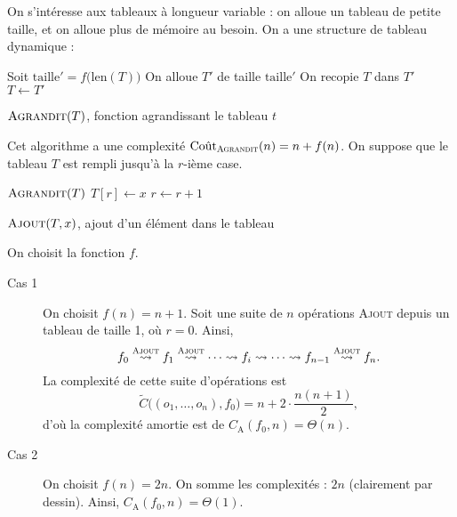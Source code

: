 {{		\begin{exm}
			On s'intéresse aux tableaux à longueur variable : on alloue un tableau de petite taille, et on alloue plus de mémoire au besoin.
			On a une structure de tableau dynamique :
			\begin{algorithm}[H]
				\centering
				\begin{algorithmic}[1]
					\State Soit $\mathrm{taille}' = f\big(\mathrm{len}(T)\big)$ 
					\State On alloue $T'$\/ de taille $\mathrm{taille}'$
					\State On recopie $T$\/ dans $T'$\/
					\State $T \gets T'$\/
				\end{algorithmic}
				\caption{$\textsc{Agrandit}(T)$, fonction agrandissant le tableau $t$\/}
			\end{algorithm}
			Cet algorithme a une complexité $\mathrm{Co\hat ut}_\textsc{Agrandit}(n) = n + f(n)$.
			On suppose que le tableau $T$\/ est rempli jusqu'à la $r$-ième case.
			\begin{algorithm}[H]
				\centering
				\begin{algorithmic}[1]
					\If{$\mathrm{len}(T) = r$}
					\State $\textsc{Agrandit}(T)$
					\EndIf
					\State $T[r] \gets x$
					\State $r \gets r + 1$
				\end{algorithmic}
				\caption{$\textsc{Ajout}(T,x)$, ajout d'un élément dans le tableau}
			\end{algorithm}
			On choisit la fonction $f$.
			\begin{description}
				\item[Cas 1] On choisit $f(n) = n + 1$. Soit une suite de $n$\/ opérations \textsc{Ajout} depuis un tableau de taille 1, où $r = 0$. Ainsi, \[
						f_0\overset{\textsc{Ajout}}\leadsto f_1 \overset{\textsc{Ajout}}\leadsto \cdots \leadsto f_i \leadsto \cdots \leadsto f_{n-1} \overset{\textsc{Ajout}}\leadsto f_n
					.\] La complexité de cette suite d'opérations est \[
						\tilde C\big((o_1, \ldots, o_n), f_0) = n + 2 \cdot \frac{n(n+1)}{2},
					\] d'où la complexité amortie est de $C_\mathrm{A}(f_0, n) = \Theta(n)$.
				\item[Cas 2] On choisit $f(n) = 2n$. On somme les complexités : $2n$\/ (clairement par dessin). Ainsi, $C_\mathrm{A}(f_0, n) = \Theta(1)$.
			\end{description}
		\end{exm}
	
}}

